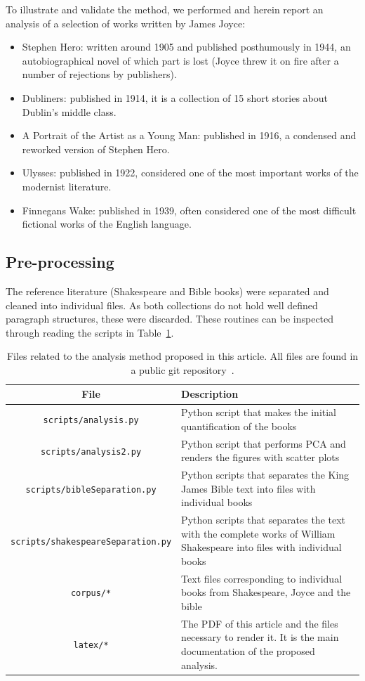 \documentclass[12pt,fleqn]{article}
\begin{document}
To illustrate and validate the method,
we performed and herein report an analysis of a selection of works written by James Joyce:
\begin{itemize}
    \item Stephen Hero: written around 1905 and published posthumously in 1944, an autobiographical novel of which part is lost
        (Joyce threw it on fire after a number of rejections by publishers).
    \item Dubliners: published in 1914, it is a collection of 15 short stories about Dublin's middle class.
    \item A Portrait of the Artist as a Young Man: published in 1916, a condensed and reworked version of Stephen Hero. 
    \item Ulysses: published in 1922, considered one of the most important works of the modernist literature.
    \item Finnegans Wake: published in 1939, often considered one of the most difficult fictional works of the English language.
\end{itemize}

\subsection{Pre-processing}
The reference literature (Shakespeare and Bible books) were separated and cleaned into
individual files.
As both collections do not hold well defined paragraph structures,
these were discarded.
These routines can be inspected through reading the scripts in Table~\ref{tab:files}.

\begin{table}[H] %
	\caption{Files related to the analysis method proposed in this article.
	All files are found in a public git repository~\citep{repo}.}\label{tab:files}
\vspace{12pt}
\centering{}
	\begin{tabular}{  c | p{7cm} }
	\textbf{File}           & \textbf{Description} \\\hline
	\texttt{scripts/analysis.py}  & Python script that makes the initial quantification of the books \\
	\texttt{scripts/analysis2.py}  & Python script that performs PCA and renders the figures with scatter plots \\
	\texttt{scripts/bibleSeparation.py}  & Python scripts that separates the King James Bible text into files with individual books \\
	\texttt{scripts/shakespeareSeparation.py}  & Python scripts that separates the text with the complete works of William Shakespeare into files with individual books \\
        \texttt{corpus/*}  & Text files corresponding to individual books from Shakespeare, Joyce and the bible  \\
	\texttt{latex/*}  & The PDF of this article and the files necessary to render it. It is the main documentation of the proposed analysis. \\
\end{tabular}
\end{table}
\end{document}
